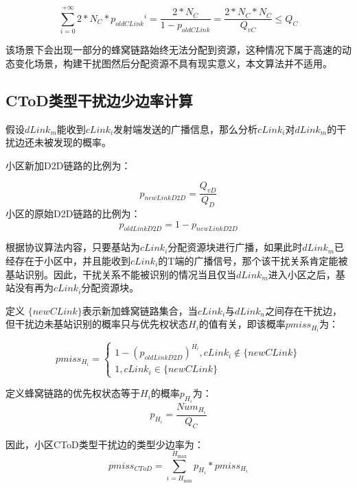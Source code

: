 \documentclass[figurelist,tablelist,algorithmlist,nomlist,masters]{seuthesix}
\begin{document}
	\begin{equation}\label{eq3.1}
	\sum\limits_{i = 0}^{ + \infty } {2*N_C*{p_{oldCLink}}^i}  = \frac{{2*N_C}}{{1 - {p_{oldCLink}}}} = \frac{{2*N_C*N_C}}{{Q_{vC}}} \le Q_C
	\end{equation}
	
	该场景下会出现一部分的蜂窝链路始终无法分配到资源，这种情况下属于高速的动态变化场景，构建干扰图然后分配资源不具有现实意义，本文算法并不适用。
	
	
	\subsection{CToD类型干扰边少边率计算}
	假设$dLink_m$能收到$cLink_i$发射端发送的广播信息，那么分析$cLink_i$对$dLink_m$的干扰边还未被发现的概率。
	
	小区新加D2D链路的比例为：
	
	\begin{equation}\label{eq3.1}
	{p_{newLinkD2D}} = \frac{{Q_{vD}}}{{Q_D}}
	\end{equation}
	小区的原始D2D链路的比例为：
	\begin{equation}\label{eq3.1}
	{p_{oldLinkD2D}} = 1 - {p_{newLinkD2D}}
	\end{equation}
	
	根据协议算法内容，只要基站为$cLink_i$分配资源块进行广播，如果此时$dLink_m$已经存在于小区中，并且能收到$cLink_i$的T端的广播信号，那个该干扰关系肯定能被基站识别。因此，干扰关系不能被识别的情况当且仅当$dLink_m$进入小区之后，基站没有再为$cLink_i$分配资源块。
	
	定义 $\{ newCLink\} $表示新加蜂窝链路集合，当$cLink_i$与$dLink_n$之间存在干扰边，但干扰边未基站识别的概率只与优先权状态${H_i}$的值有关，即该概率$pmis{s_{{H_i}}}$为：
	
	\begin{equation}\label{eq3.1}
	pmis{s_{{H_i}}} = \left\{ \begin{array}{l}
	1 - {({p_{oldLinkD2D}})^{{H_i}}},cLink_i \notin \{ newCLink\} \\
	1,cLink_i \in \{ newCLink\} 
	\end{array} \right.
	\end{equation}
	
	定义蜂窝链路的优先权状态等于${H_i}$的概率${p_{{H_i}}}$为：
	\begin{equation}\label{eq3.1}
	{p_{{H_i}}} = \frac{{Nu{m_{{H_i}}}}}{{Q_C}}
	\end{equation}
	
	因此，小区CToD类型干扰边的类型少边率为：
	\begin{equation}\label{eq3.1}
	pmis{s_{CToD}} = \sum\limits_{i = {H_{\min }}}^{{H_{\max }}} {{p_{{H_i}}}*pmis{s_{{H_i}}}}
	\end{equation}
	
\end{document}
